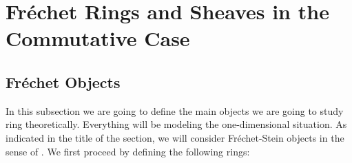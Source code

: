 \documentclass[12pt]{amsart}
\theoremstyle{definition}
\numberwithin{equation}{section}
\begin{document}
\newpage

\section{Fr\'echet Rings and Sheaves in the Commutative Case}

\subsection{Fr\'echet Objects}


\indent In this subsection we are going to define the main objects we are going to study ring theoretically. Everything will be modeling the one-dimensional situation. As indicated in the title of the section, we will consider Fr\'echet-Stein objects in the sense of \cite{ST1}. We first proceed by defining the following rings:
\end{document}
